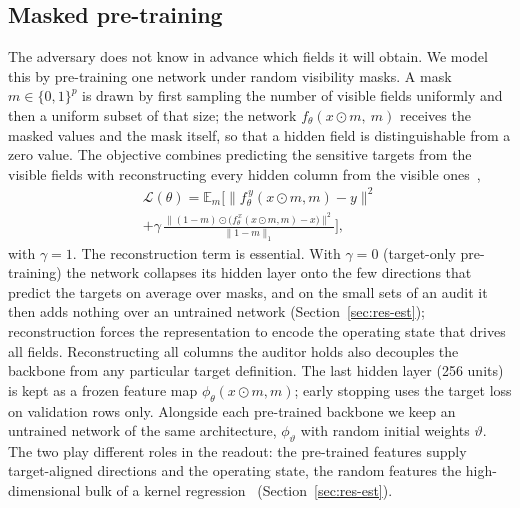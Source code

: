\subsection{Masked pre-training}
The adversary does not know in advance which fields it will obtain. We model this by
pre-training one network under random visibility masks. A mask $m\in\{0,1\}^{p}$ is drawn by
first sampling the number of visible fields uniformly and then a uniform subset of that size;
the network $f_\theta(x\odot m,\ m)$ receives the masked values and the mask itself, so that a
hidden field is distinguishable from a zero value. The objective combines predicting the sensitive targets from the visible fields with reconstructing every hidden column
from the visible ones~\cite{yoon2020vime,he2022mae},
\begin{multline}\label{eq:pretrain}
\mathcal L(\theta)=\mathbb{E}_{m}\Big[\big\|f^{\,y}_\theta(x\odot m,m)-y\big\|^2\\
+\gamma\,\frac{\big\|(1-m)\odot\big(f^{\,x}_\theta(x\odot m,m)-x\big)\big\|^2}{\|1-m\|_1}\Big],
\end{multline}
with $\gamma=1$. The reconstruction term is essential. With $\gamma=0$ (target-only pre-training) the network collapses its
hidden layer onto the few directions that predict the targets on average over masks, and on the small sets of an audit it
then adds nothing over an untrained network (Section~\ref{sec:res-est}); reconstruction forces the representation to encode
the operating state that drives all fields. Reconstructing all columns the auditor holds also decouples the backbone from
any particular target definition. The last hidden layer (256 units) is kept as a frozen feature map
$\phi_\theta(x\odot m, m)$; early stopping uses the target loss on validation rows only. Alongside each pre-trained backbone
we keep an untrained network of the same architecture, $\phi_{\vartheta}$ with random initial weights $\vartheta$. The two
play different roles in the readout: the pre-trained features supply target-aligned directions and the operating state, the
random features the high-dimensional bulk of a kernel regression~\cite{rahimi2007random} (Section~\ref{sec:res-est}).

